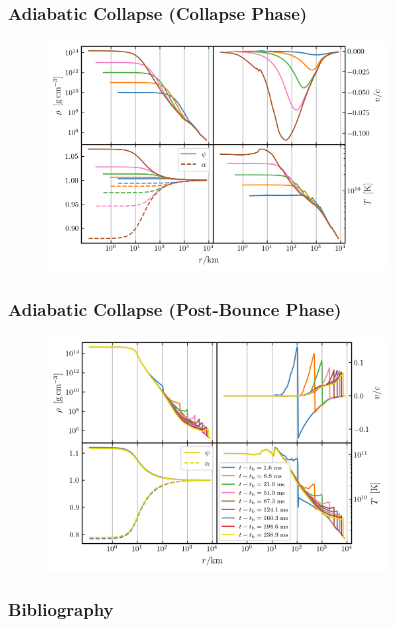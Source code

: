 \documentclass{beamer}
\begin{document}
\begin{frame}
\frametitle{Adiabatic Collapse (Collapse Phase)}

  \begin{figure}[htb!]
    \centering
    \includegraphics[width=0.8\textwidth]{fig.collapse.png}
  \end{figure}

\end{frame}

\begin{frame}
\frametitle{Adiabatic Collapse (Post-Bounce Phase)}

  \begin{figure}[htb!]
    \centering
    \includegraphics[width=0.8\textwidth]{fig.postBounce.png}
  \end{figure}

\end{frame}

\begin{frame}
\frametitle{Bibliography}

  \Fontvii
  

\end{frame}
\end{document}
